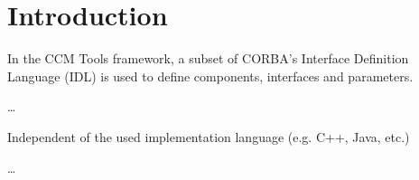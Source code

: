 \section{Introduction}

In the CCM Tools framework, a subset of CORBA's Interface Definition Language
(IDL) is used to define components, interfaces and parameters.

\dots

Independent of the used implementation language (e.g. C++, Java, etc.)

\dots
\newpage
